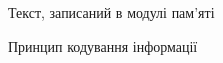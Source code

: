 \documentclass[a4paper,14pt]{extreport}
\begin{document}
\begin{figure}[h]
  \caption{Текст, записаний в модулі пам'яті}
  \label{ris9}
\end{figure}



\begin{figure}[h!]
  \caption{Принцип кодування інформації}
  \label{ris10}
\end{figure}
\end{document}
